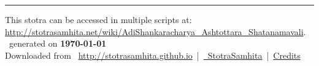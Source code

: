 \documentclass[a5paper,twoside,12pt]{book}
\begin{document}
\setmainfont[Script=Devanagari,Mapping=tex-text]{Sanskrit 2003}
\fontsize {16}{19.25}\selectfont
\let\head\chapt
\begin{center}

\end{center}
\vfill
\centering
\rule{0.8\textwidth}{0.6pt}

\footnotesize
{}\sffamily
This stotra can be accessed in multiple scripts at:\\
\url{http://stotrasamhita.net/wiki/AdiShankaracharya_Ashtottara_Shatanamavali}.\\[1ex]
\faFilePdfO~generated on \textbf{\today}\\[1ex]
Downloaded from \faGlobe{}~\url{http://stotrasamhita.github.io}~|~\href{https://github.com/StotraSamhita}{\faGithubSquare{}~StotraSamhita}~|~\href{https://stotrasamhita.github.io/about/}{Credits}
\end{document}
